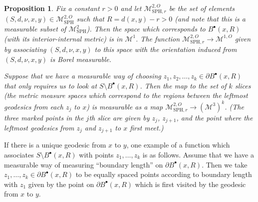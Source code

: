 \documentclass[JEP,XML,SOM,Unicode]{cedram}
\let\mathcal\mathscr
\newcommand{\sbullet}{{\scriptscriptstyle\bullet}}
\theoremstyle{plain}
\numberwithin{theorem}{section}
\newtheorem{proposition}[theorem]{Proposition}
\theoremstyle{definition}
\newcommand\gmsspace{{\mathcal M}_{\mathrm{SPH}}}
\newcommand\gmsspacer{{\mathcal M}_{\mathrm{SPH},r}}
\newcommand\mmspace{{\mathcal M}}
\newcommand{\fb}[2]{B^\sbullet(#1,#2)}
\begin{document}
\begin{proposition}
\label{prop::ball_interior_measurable}
Fix a constant $r > 0$ and let $\gmsspacer^{2,O}$ be the set of elements $(S,d,\nu,x,y) \in \gmsspace^{2,O}$ such that $R = d(x,y) - r > 0$ (and note that this is a \hbox{measurable} subset of $\gmsspace^2$). Then the space which corresponds to $\fb{x}{R}$ (with its interior-internal metric) is in $\mmspace^1$. The function $\gmsspacer^{2,O} \to \mmspace^{1,O}$ given by associating $(S,d,\nu,x,y)$ to this space with the orientation induced from $(S,d,\nu,x,y)$ is Borel measurable.

Suppose that we have a measurable way of choosing $z_1, z_2, \ldots, z_k \in \partial \fb{x}{R}$ that only requires us to look at $S \setminus \fb{x}{R}$. Then the map to the set of $k$ slices (\ie the metric measure spaces which correspond to the regions between the leftmost geodesics from each $z_j$ to $x$) is measurable as a map $\gmsspacer^{2,O} \to (\mmspace^3)^k$. (The three marked points in the $j$th slice are given by $z_j$, $z_{j+1}$, and the point where the leftmost geodesics from $z_j$ and $z_{j+1}$ to $x$ first meet.)
\end{proposition}
If there is a unique geodesic from $x$ to $y$, one example of a function which associates $S \setminus \fb{x}{R}$ with points $z_1,\ldots,z_k$ is as follows. Assume that we have a measurable way of measuring ``boundary length'' on $\partial \fb{x}{R}$. Then we take $z_1,\ldots,z_k \in \partial \fb{x}{R}$ to be equally spaced points according to boundary length with $z_1$ given by the point on $\partial \fb{x}{R}$ which is first visited by the geodesic from $x$ to $y$.
\end{document}
